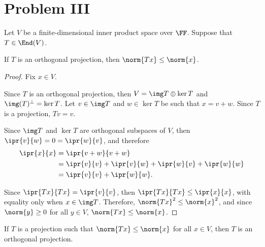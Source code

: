 \documentclass[11pt]{scrartcl}
\begin{document}
\section{Problem III}

Let $V$ be a finite-dimensional inner product space over $\FF$. Suppose that $T \in \End(V)$.

\begin{lemma}
  If $T$ is an orthogonal projection, then  $\norm{Tx}\leq \norm{x}$.
\end{lemma}

\begin{proof}
  \hfill

  Fix $x\in V$.

  Since $T$ is an orthogonal projection, then
  $V = \img T \oplus \ker T$ and $\img(T)^{\bot} = \ker T$. Let
  $v \in \img T$ and $w\in \ker T$ be such that $x = v + w$. Since $T$
  is a projection, $Tv = v$.

  Since $\img T$ and $\ker T$ are orthogonal subspaces of $V$, then
  $\ipr{v}{w} = 0 = \ipr{w}{v}$, and therefore
  \begin{align}
    \ipr{x}{x} &= \ipr{v+w}{v+w}\\
               &= \ipr{v}{v} + \ipr{v}{w}+\ipr{w}{v}+\ipr{w}{w}\\
               &= \ipr{v}{v}+\ipr{w}{w}.
  \end{align}

  Since $\ipr{Tx}{Tx}=\ipr{v}{v}$, then $\ipr{Tx}{Tx}\leq \ipr{x}{x}$,
  with equality only when $x\in\img T$. Therefore,
  $\norm{Tx}^2\leq \norm{x}^2$, and since $\norm{y} \geq 0$ for all
  $y\in V$, $\norm{Tx}\leq \norm{x}$.

\end{proof}

\begin{lemma}
  \label{sec:problem-iii}
  If $T$ is a projection such that $\norm{Tx}\leq \norm{x}$ for all
  $x\in V$, then $T$ is an orthogonal projection.
\end{lemma}
\end{document}
